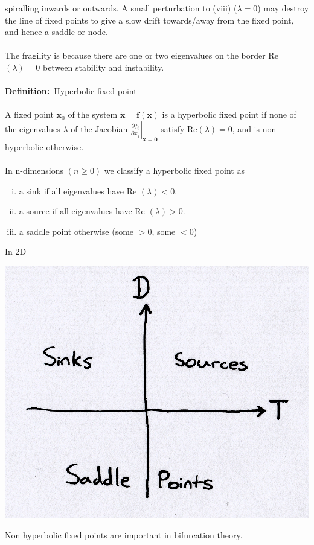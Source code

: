 \documentclass{article}
\newcommand{\definition}{\textbf{Definition:}}              %
\newcommand{\pder}[2] {\frac{\partial {#1}}{\partial {#2} }}%
\begin{document}
spiralling inwards or outwards. A small perturbation to (viii) ($\lambda = 0$) 
may destroy the line of fixed points to give a slow drift towards/away from the
fixed point, and hence a saddle or node.
\\
\\
The fragility is because there are one or two eigenvalues on the border
Re$(\lambda) = 0$ between stability and instability.
\\
\\
\definition\ Hyperbolic fixed point
\\
\\
A fixed point $\bm{x}_0$ of the system $\dot{\bm{x}} = \bm{f}(\bm{x})$ is a
hyperbolic fixed point if none of the eigenvalues $\lambda$ of the Jacobian
$\displaystyle \left. \pder{f_i}{x_j} \right| _{\bm{x} = \bm{0}} $ satisfy
Re$(\lambda) = 0$, and is non-hyperbolic otherwise.
\\
\\
In n-dimensions $(n \geq 0)$ we classify a hyperbolic fixed point as
\begin{enumerate}[(i)]
\item a sink if all eigenvalues have Re $(\lambda) < 0$.
\item a source if all eigenvalues have Re $(\lambda) > 0$.
\item a saddle point otherwise (some $>0$, some $<0$)
\end{enumerate}
In 2D
\begin{center}
\includegraphics[scale = 0.15]{Diagram2.png}
\end{center}
Non hyperbolic fixed points are important in bifurcation theory.
\\
\end{document}
